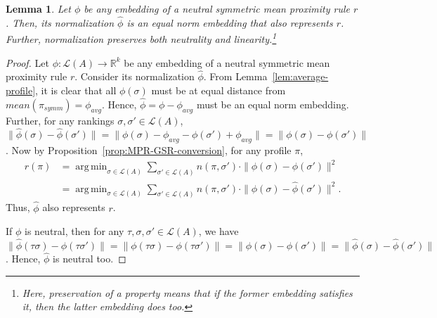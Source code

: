 \documentclass[10pt,letterpaper]{article}
\newcommand{\calL}{{\mathcal{L}}}
\newcommand{\rank}{{\calL(A)}}
\DeclareMathOperator*{\argmin}{arg\,min}
\newtheorem{lemma}{Lemma}
\begin{document}
\begin{lemma}
Let $\phi$ be any embedding of a neutral symmetric mean proximity rule $r$. Then, its normalization $\hat{\phi}$ is an equal norm embedding that also represents $r$. Further, normalization preserves both neutrality and linearity.\footnote{Here, preservation of a property means that if the former embedding satisfies it, then the latter embedding does too.}
\label{lem:preservation}
\end{lemma}
\begin{proof}
Let $\phi : \rank \rightarrow \mathbb{R}^k$ be any embedding of a neutral symmetric mean proximity rule $r$. Consider its normalization $\hat{\phi}$. From Lemma~\ref{lem:average-profile}, it is clear that all $\phi(\sigma)$ must be at equal distance from $mean(\pi_{symm}) = \phi_{avg}$. Hence, $\hat{\phi} = \phi-\phi_{avg}$ must be an equal norm embedding. Further, for any rankings $\sigma, \sigma' \in \rank$, $\|\hat{\phi}(\sigma)-\hat{\phi}(\sigma')\| = \|\phi(\sigma)-\phi_{avg}-\phi(\sigma')+\phi_{avg}\| = \|\phi(\sigma)-\phi(\sigma')\|$. Now by Proposition~\ref{prop:MPR-GSR-conversion}, for any profile $\pi$,
\begin{align*}
r(\pi) &= \argmin_{\sigma \in \rank} \sum_{\sigma' \in \rank} n(\pi,\sigma') \cdot \|\phi(\sigma)-\phi(\sigma')\|^2 \\
&= \argmin_{\sigma \in \rank} \sum_{\sigma' \in \rank} n(\pi,\sigma') \cdot \|\hat{\phi}(\sigma)-\hat{\phi}(\sigma')\|^2.
\end{align*}
Thus, $\hat{\phi}$ also represents $r$. 

If $\phi$ is neutral, then for any $\tau,\sigma,\sigma' \in \rank$, we have $\|\hat{\phi}(\tau \sigma)-\hat{\phi}(\tau \sigma')\| = \|\phi(\tau \sigma)-\phi(\tau \sigma')\| = \|\phi(\sigma)-\phi(\sigma')\| = \|\hat{\phi}(\sigma)-\hat{\phi}(\sigma')\|$. Hence, $\hat{\phi}$ is neutral too. 


\end{proof}
\end{document}

